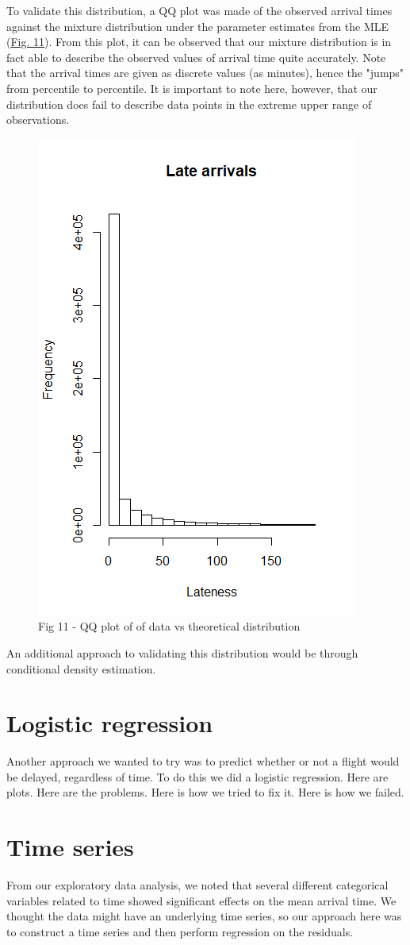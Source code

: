 \documentclass[12pt, a4paper]{book}
\newcommand\tab[1][1cm]{\hspace*{#1}}
\begin{document}
	\tab To validate this distribution, a QQ plot was made of the observed arrival times against the mixture distribution under the parameter estimates from the MLE (\underline{Fig. 11}). From this plot, it can be observed that our mixture distribution is in fact able to describe the observed values of arrival time quite accurately. Note that the arrival times are given as discrete values (as minutes), hence the "jumps" from percentile to percentile. It is important to note here, however, that our distribution does fail to describe data points in the extreme upper range of observations. \\
			\begin{figure}
			\centering
	 		\includegraphics[width = .45 \textwidth]{../figures/LateArrivalsHistogram}
	 		\caption{Fig 11  - QQ plot of of data vs theoretical distribution}
	 		\end{figure}
	\tab An additional approach to validating this distribution would be through conditional density estimation.\\
	\section{Logistic regression}
	\tab Another approach we wanted to try was to predict whether or not a flight would be delayed, regardless of time. To do this we did a logistic regression. Here are plots. Here are the problems. Here is how we tried to fix it. Here is how we failed.
	\section{Time series}
	\tab From our exploratory data analysis, we noted that several different categorical variables related to time showed significant effects on the mean arrival time. We thought the data might have an underlying time series, so our approach here was to construct a time series and then perform regression on the residuals. 
	
\end{document}
